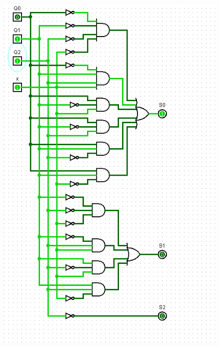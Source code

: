 \documentclass[]{article}
\begin{document}
\begin{minipage}{0.5\textwidth}
\begin{figure}[H]
	\centering
	\includegraphics[width=1\textwidth]{test1_3.png}
\end{figure}
\end{minipage}
\end{document}
